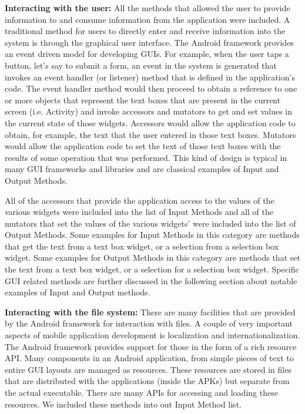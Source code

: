 \documentclass{sig-alternate}
\begin{document}
\textbf{Interacting with the user:} All the methods that allowed the user to provide information to and consume information from the application were included. A traditional method for users to directly enter and receive information into the system is through the graphical user interface. The Android framework provides an event driven model for developing GUIs. For example, when the user taps a button, let's say to submit a form, an event in the system is generated that invokes an event handler (or listener) method that is defined in the application's code. The event handler method would then proceed to obtain a reference to one or more objects that represent the text boxes that are present in the current screen (i.e. Activity) and invoke accessors and mutators to get and set values in the current state of those widgets. Accessors would allow the application code to obtain, for example, the text that the user entered in those text boxes. Mutators would allow the application code to set the text of those text boxes with the results of some operation that was performed. This kind of design is typical in many GUI frameworks and libraries and are classical examples of Input and Output Methods. 

All of the accessors that provide the application access to the values of the various widgets were included into the list of Input Methods and all of the mutators that set the values of the various widgets' were included into the list of Output Methods. Some examples for Input Methods in this category are methods that get the text from a text box widget, or a selection from a selection box widget. Some examples for Output Methods in this category are methods that set the text from a text box widget, or a selection for a selection box widget. Specific GUI related methods are further discussed in the following section about notable examples of Input and Output methods.

\textbf{Interacting with the file system:} There are many facilities that are provided by the Android framework for interaction with files. A couple of very important aspects of mobile application development is localization and internationalization. The Android framework provides support for those in the form of a rich resource API. Many components in an Android application, from simple pieces of text to entire GUI layouts are managed as resources. These resources are stored in files that are distributed with the applications (inside the APKs) but separate from the actual executable. There are many APIs for accessing and loading these resources. We included these methods into out Input Method list. 
\end{document}
